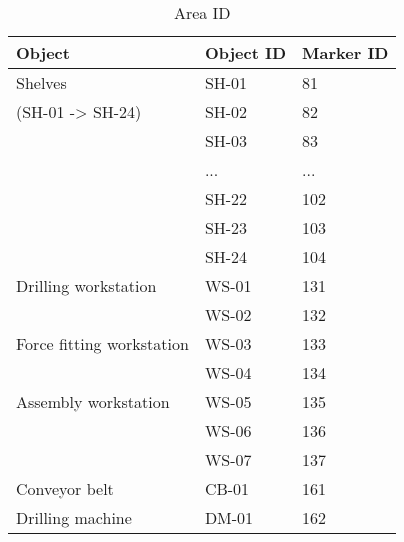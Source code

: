 \newpage

\begin{longtable}{|l|l|l|}
\caption{Area ID}
\label{tab:AreaID}
\\ \hline
\textbf{Object} & \textbf{Object ID} & \textbf{Marker ID}\\ 
  \hline 
Shelves & SH-01 & 81 \\ \cline{2-3}
(SH-01 -> SH-24) & SH-02 & 82 \\ \cline{2-3}
& SH-03 & 83 \\ \cline{2-3}
& ... & ... \\ \cline{2-3}
& SH-22 & 102 \\ \cline{2-3}
& SH-23 & 103 \\ \cline{2-3}
& SH-24 & 104 \\ \hline
Drilling workstation & WS-01 & 131 \\ \cline{2-3}
& WS-02 & 132 \\ \hline
Force fitting workstation & WS-03 & 133 \\ \cline{2-3}
& WS-04 & 134 \\ \hline
Assembly workstation & WS-05 & 135 \\ \cline{2-3}
& WS-06 & 136 \\ \cline{2-3}
& WS-07 & 137 \\ \hline
Conveyor belt & CB-01 & 161 \\ \hline
Drilling machine & DM-01 & 162 \\ \hline
\end{longtable} 		
